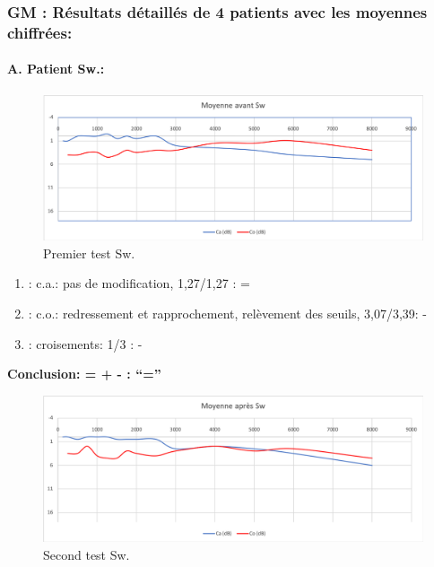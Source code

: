   \subsubsection{GM : Résultats détaillés de 4 patients avec les moyennes chiffrées:}

\paragraph{ A. Patient Sw.:}



 \begin{figure}
\centering
\includegraphics[width=0.7\linewidth]{images/graphiques/sw_pre.png}
\caption[Moyenne OG+OD]{Premier test Sw.}
       
\label{groupecontroleimage1}
\end{figure}

	\begin{enumerate}
 		
 		\item : c.a.: pas de modification, 1,27/1,27 : =
                
 		\item : c.o.: redressement et rapprochement, relèvement des seuils, 3,07/3,39: -
 		\item : croisements: 1/3 :  -
                  
                \end{enumerate}

                \textbf{  Conclusion:  = +  -        : ``=''}

                \begin{figure}
\centering
\includegraphics[width=0.7\linewidth]{images/graphiques/sw_post.png}
\caption[Moyenne OG+OD]{Second test Sw.}
       
\label{groupecontroleimage1}
\end{figure}




